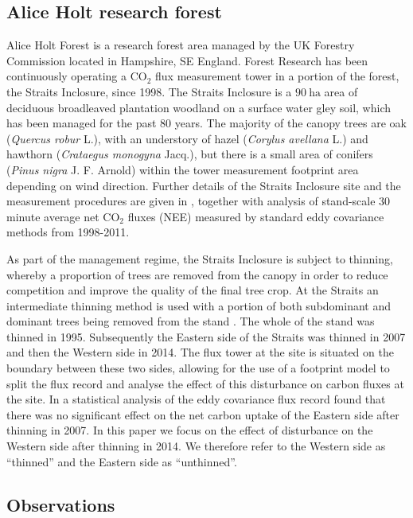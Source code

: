 \documentclass[draft,linenumbers]{agujournal}
\begin{document}
\subsection{Alice Holt research forest} \label{sec:site_description}

Alice Holt Forest is a research forest area managed by the UK Forestry Commission located in Hampshire, SE England. Forest Research has been continuously operating a $\text{CO}_{2}$ flux measurement tower in a portion of the forest, the Straits Inclosure, since 1998. The Straits Inclosure is a $90~\text{ha}$ area of deciduous broadleaved plantation woodland on a surface water gley soil, which has been managed for the past 80 years. The majority of the canopy trees are oak (\textit{Quercus robur} L.), with an understory of hazel (\textit{Corylus avellana} L.) and hawthorn (\textit{Crataegus monogyna} Jacq.), but there is a small area of conifers (\textit{Pinus nigra} J. F. Arnold) within the tower measurement footprint area depending on wind direction. Further details of the Straits Inclosure site and the measurement procedures are given in \citet{wilkinson2012inter}, together with analysis of stand-scale $30$ minute average net $\text{CO}_{2}$ fluxes (NEE) measured by standard eddy covariance methods from 1998-2011. 

As part of the management regime, the Straits Inclosure is subject to thinning, whereby a proportion of trees are removed from the canopy in order to reduce competition and improve the quality of the final tree crop. At the Straits an intermediate thinning method is used with a portion of both subdominant and dominant trees being removed from the stand \citep{kerr2011thinning}. The whole of the stand was thinned in 1995. Subsequently the Eastern side of the Straits was thinned in 2007 and then the Western side in 2014. The flux tower at the site is situated on the boundary between these two sides, allowing for the use of a footprint model to split the flux record and analyse the effect of this disturbance on carbon fluxes at the site. In \citet{wilkinson2015effects} a statistical analysis of the eddy covariance flux record found that there was no significant effect on the net carbon uptake of the Eastern side after thinning in 2007. In this paper we focus on the effect of disturbance on the Western side after thinning in 2014. We therefore refer to the Western side as ``thinned'' and the Eastern side as ``unthinned''.   

\subsection{Observations} \label{sec:obs}
\end{document}
